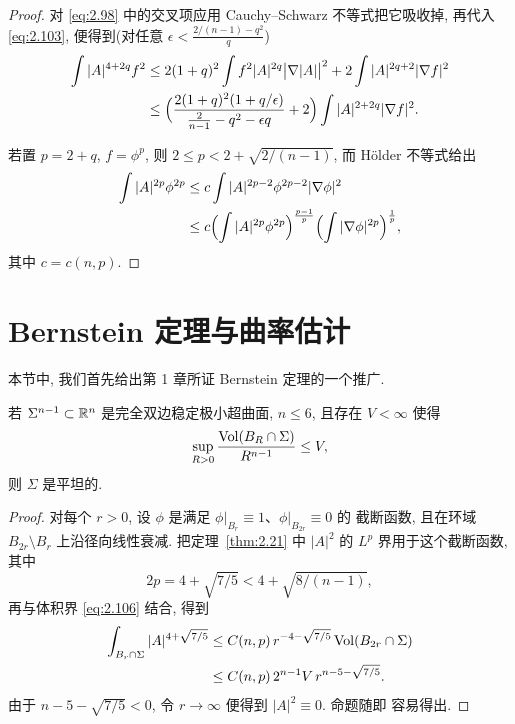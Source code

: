 \begin{proof}
对 \eqref{eq:2.98} 中的交叉项应用 Cauchy--Schwarz 不等式把它吸收掉, 再代入 \eqref{eq:2.103},
便得到(对任意 $\epsilon<\frac{2/(n-1)-q^{2}}{q}$)
\begin{equation}
\begin{aligned}
\int|A|^{4+2q}f^{2}
&\leq2(1+q)^{2}\int f^{2}|A|^{2q}\bigl|\nabla|A|\bigr|^{2}
 +2\int|A|^{2q+2}|\nabla f|^{2}\\
&\leq\Bigl(\frac{2(1+q)^{2}(1+q/\epsilon)}
 {\frac{2}{n-1}-q^{2}-\epsilon q}+2\Bigr)\int|A|^{2+2q}|\nabla f|^{2}.
\end{aligned}
\label{eq:2.104}
\end{equation}

若置 $p=2+q$, $f=\phi^{p}$, 则 $2\leq p<2+\sqrt{2/(n-1)}$, 而 Hölder
不等式给出
\begin{equation}
\begin{aligned}
\int|A|^{2p}\phi^{2p}
&\leq c\int|A|^{2p-2}\phi^{2p-2}|\nabla\phi|^{2}\\
&\leq c\Bigl(\int|A|^{2p}\phi^{2p}\Bigr)^{\frac{p-1}{p}}
 \Bigl(\int|\nabla\phi|^{2p}\Bigr)^{\frac1p},
\end{aligned}
\label{eq:2.105}
\end{equation}
其中 $c=c(n,p)$.
\end{proof}

\section{Bernstein 定理与曲率估计}
\label{sec:2.5}

本节中, 我们首先给出第 1 章所证 Bernstein 定理的一个推广.

\begin{theorem}
\label{thm:2.22}
若 $\Sigma^{n-1}\subset\mathbb{R}^n$ 是完全双边稳定极小超曲面, $n\leq6$, 且存在
$V<\infty$ 使得
\begin{equation}
\sup_{R>0}\frac{\operatorname{Vol}(B_R\cap\Sigma)}{R^{n-1}}\leq V,
\label{eq:2.106}
\end{equation}
则 $\Sigma$ 是平坦的.
\end{theorem}

\begin{proof}
对每个 $r>0$, 设 $\phi$ 是满足 $\phi|_{B_r}\equiv1$、$\phi|_{B_{2r}}\equiv0$ 的
截断函数, 且在环域 $B_{2r}\setminus B_r$ 上沿径向线性衰减. 把定理~\ref{thm:2.21}
中 $|A|^{2}$ 的 $L^{p}$ 界用于这个截断函数, 其中
\begin{equation}
2p=4+\sqrt{7/5}<4+\sqrt{8/(n-1)},
\label{eq:2.107}
\end{equation}
再与体积界 \eqref{eq:2.106} 结合, 得到
\begin{equation}
\begin{aligned}
\int_{B_r\cap\Sigma}|A|^{4+\sqrt{7/5}}
&\leq C(n,p)\,r^{-4-\sqrt{7/5}}\operatorname{Vol}(B_{2r}\cap\Sigma)\\
&\leq C(n,p)\,2^{n-1}V\,r^{n-5-\sqrt{7/5}}.
\end{aligned}
\label{eq:2.108}
\end{equation}
由于 $n-5-\sqrt{7/5}<0$, 令 $r\to\infty$ 便得到 $|A|^{2}\equiv0$. 命题随即
容易得出.
\end{proof}

